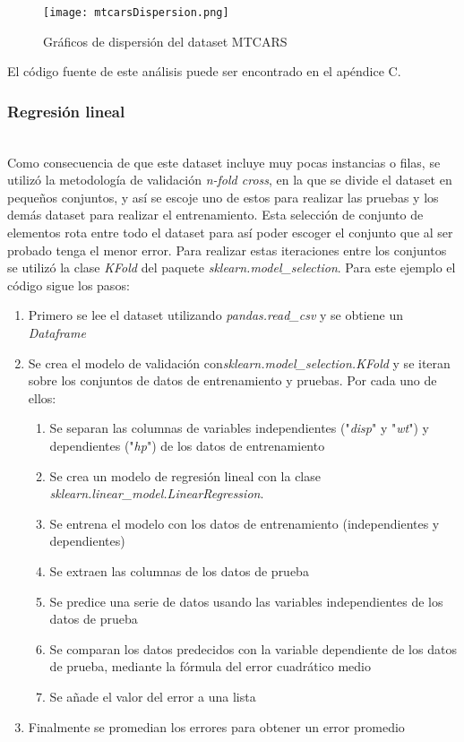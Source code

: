 \documentclass[sigconf,authorversion,nonacm]{acmart}
\begin{document}
\begin{figure}[H]
  \centering
  \texttt{[image: mtcarsDispersion.png]}
  \caption{Gráficos de dispersión del dataset MTCARS}
\end{figure}

El código fuente de este análisis puede ser encontrado en el apéndice C.

\subsubsection{Regresión lineal}\hfill\\
Como consecuencia de que este dataset incluye muy pocas instancias o filas, se utilizó la metodología de validación \textit{n-fold cross}, en la que se divide el dataset en pequeños conjuntos, y así se escoje uno de estos para realizar las pruebas y los demás dataset para realizar el entrenamiento. Esta selección de conjunto de elementos rota entre todo el dataset para así poder escoger el conjunto que al ser probado tenga el menor error. Para realizar estas iteraciones entre los conjuntos se utilizó la clase \textit{KFold} del paquete \textit{sklearn.model\_selection}.
Para este ejemplo el código sigue los pasos:
\begin{enumerate}
  \item Primero se lee el dataset utilizando \textit{pandas.read\_csv} y se obtiene un \textit{Dataframe}
  \item Se crea el modelo de validación con\newline\textit{sklearn.model\_selection.KFold} y se iteran sobre los conjuntos de datos de entrenamiento y pruebas. Por cada uno de ellos:
  \begin{enumerate}
    \item Se separan las columnas de variables independientes ("\textit{disp}" y "\textit{wt}") y dependientes ("\textit{hp}") de los datos de entrenamiento
    \item Se crea un modelo de regresión lineal con la clase\newline
      \textit{sklearn.linear\_model.LinearRegression}\cite{scikit-learn}.
    \item Se entrena el modelo con los datos de entrenamiento (independientes y dependientes)
    \item Se extraen las columnas de los datos de prueba
    \item Se predice una serie de datos usando las variables independientes de los datos de prueba
    \item Se comparan los datos predecidos con la variable dependiente de los datos de prueba, mediante la fórmula del error cuadrático medio
    \item Se añade el valor del error a una lista
  \end{enumerate}
  \item Finalmente se promedian los errores para obtener un error promedio
\end{enumerate}
\end{document}
